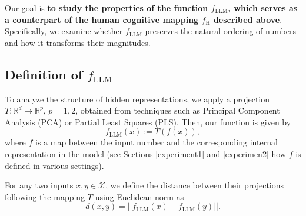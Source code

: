Our goal is \textbf{to study the properties of the function $f_{\text{LLM}}$, which serves as a counterpart of the human cognitive mapping $f_{\text{H}}$ described above}. Specifically, we examine  whether $f_{\text{LLM}}$ preserves the natural ordering of numbers and how it transforms their magnitudes. 



\subsection{Definition of $f_{\text{LLM}}$}
To analyze the structure of hidden representations, we apply a projection \( T: \mathbb{R}^d \to \mathbb{R}^p \), $p=1,2$, obtained from techniques such as Principal Component Analysis (PCA) or Partial Least Squares (PLS). Then, our function is given by
\begin{equation}\label{eq projection p_T}
        f_{\text{LLM}}(x) := T(f(x)),
\end{equation}
where $f$ is a map between the input number and the corresponding internal representation in the model (see Sections \ref{experiment1} and \ref{experimen2} how $f$ is defined in various settings).

For any two inputs \( x, y \in \mathcal{X} \), we define the distance between their projections following the mapping $T$ using Euclidean norm as  
\begin{equation}
d(x, y) = ||f_{\text{LLM}}(x) - f_{\text{LLM}}(y)||.
\end{equation}


